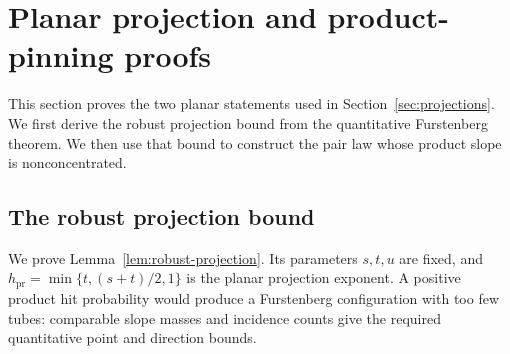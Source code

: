 \section{Planar projection and product-pinning proofs}
\label{sec:projection-proofs}

This section proves the two planar statements used in
Section~\ref{sec:projections}. We first derive the robust projection
bound from the quantitative Furstenberg theorem. We then use that bound
to construct the pair law whose product slope is nonconcentrated.

\subsection{The robust projection bound}
\label{sec:robust-projection-proof}

We prove Lemma~\ref{lem:robust-projection}. Its parameters $s,t,u$
are fixed, and $h_{\mathrm{pr}}=\min\{t,(s+t)/2,1\}$ is the planar
projection exponent. A positive product hit probability would
produce a Furstenberg configuration with too few tubes: comparable
slope masses and incidence counts give the required quantitative
point and direction bounds.

